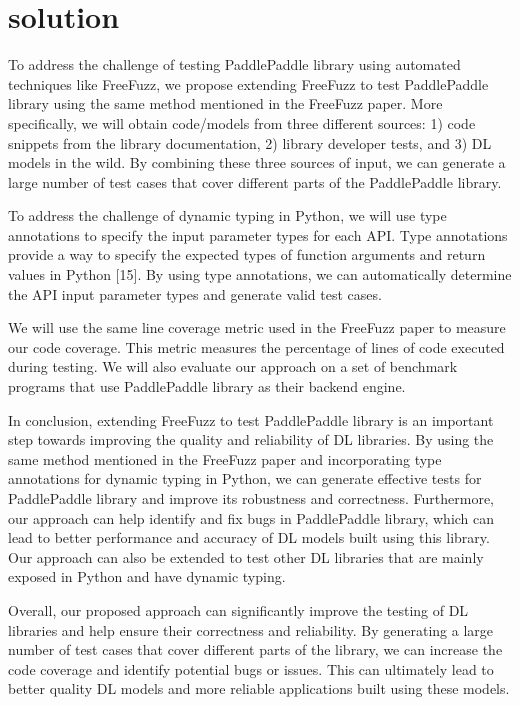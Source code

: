 \documentclass[sigconf]{acmart}
\begin{document}
\section{solution}
\par To address the challenge of testing PaddlePaddle library using automated techniques like FreeFuzz, we propose extending FreeFuzz to test PaddlePaddle library using the same method mentioned in the FreeFuzz paper. More specifically, we will obtain code/models from three different sources: 1) code snippets from the library documentation, 2) library developer tests, and 3) DL models in the wild. By combining these three sources of input, we can generate a large number of test cases that cover different parts of the PaddlePaddle library.
\par To address the challenge of dynamic typing in Python, we will use type annotations to specify the input parameter types for each API. Type annotations provide a way to specify the expected types of function arguments and return values in Python [15]. By using type annotations, we can automatically determine the API input parameter types and generate valid test cases.
\par We will use the same line coverage metric used in the FreeFuzz paper to measure our code coverage. This metric measures the percentage of lines of code executed during testing. We will also evaluate our approach on a set of benchmark programs that use PaddlePaddle library as their backend engine.
\par In conclusion, extending FreeFuzz to test PaddlePaddle library is an important step towards improving the quality and reliability of DL libraries. By using the same method mentioned in the FreeFuzz paper and incorporating type annotations for dynamic typing in Python, we can generate effective tests for PaddlePaddle library and improve its robustness and correctness. Furthermore, our approach can help identify and fix bugs in PaddlePaddle library, which can lead to better performance and accuracy of DL models built using this library. Our approach can also be extended to test other DL libraries that are mainly exposed in Python and have dynamic typing.
\par Overall, our proposed approach can significantly improve the testing of DL libraries and help ensure their correctness and reliability. By generating a large number of test cases that cover different parts of the library, we can increase the code coverage and identify potential bugs or issues. This can ultimately lead to better quality DL models and more reliable applications built using these models.
\end{document}
